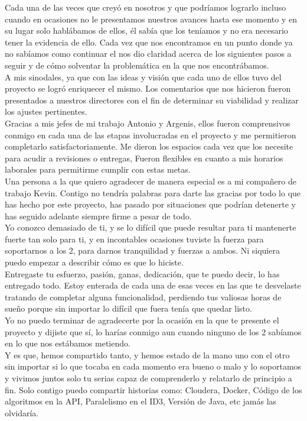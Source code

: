 Cada una de las veces que creyó en nosotros y que podríamos lograrlo incluso cuando en ocasiones no le presentamos nuestros  avances hasta ese momento y en su lugar solo hablábamos de ellos, él sabía que los teníamos y no era necesario tener la evidencia de ello. Cada vez que nos encontramos en un punto donde ya no sabíamos como continuar el nos dio claridad acerca de los siguientes pasos a seguir y de cómo solventar la problemática en la que nos encontrábamos.\\
A mis sinodales, ya que con las ideas y visión que cada uno de ellos tuvo del proyecto se logró enriquecer el mismo. Los comentarios que nos hicieron fueron presentados a nuestros directores con el fin de determinar su viabilidad y realizar los ajustes pertinentes.\\
Gracias a mis jefes de mi trabajo Antonio y Argenis, ellos fueron comprensivos conmigo en cada una de las etapas involucradas en el proyecto y me permitieron completarlo satisfactoriamente. Me dieron los espacios cada vez que los necesite para acudir a revisiones o entregas, Fueron flexibles en cuanto a mis horarios laborales para permitirme cumplir con estas metas.\\
Una persona a la que quiero agradecer de manera especial es a mi compañero de trabajo Kevin. Contigo no tendría palabras para darte las gracias por todo lo que has hecho por este proyecto, has pasado por situaciones que podrían detenerte y has seguido adelante siempre firme a pesar de todo. \\
Yo conozco demasiado de ti, y se lo difícil que puede resultar para ti mantenerte fuerte tan solo para ti, y en incontables ocasiones tuviste la fuerza para soportarnos a los 2, para darnos tranquilidad y fuerzas a ambos. Ni siquiera puedo empezar a describir cómo es que lo hiciste.\\
Entregaste tu esfuerzo, pasión, ganas, dedicación, que te puedo decir, lo has entregado todo. Estoy enterada de cada una de esas veces en las que te desvelaste tratando de completar alguna funcionalidad, perdiendo tus valiosas horas de sueño porque sin importar lo difícil que fuera tenía que quedar listo.\\
Yo no puedo terminar de agradecerte por la ocasión en la que te presente el proyecto y dijiste que sí, lo harías conmigo aun cuando ninguno de los 2 sabíamos en lo que nos estábamos metiendo.\\
Y es que, hemos compartido tanto, y hemos estado de la mano uno con el otro sin importar si lo que tocaba en cada momento era bueno o malo y lo soportamos y vivimos juntos solo tu serias capaz de comprenderlo y relatarlo de principio a fin. Solo contigo puedo compartir historias como: Cloudera, Docker, Código de los algoritmos en la API, Paralelismo en el ID3, Versión de Java, etc jamás las olvidaría.  \\
